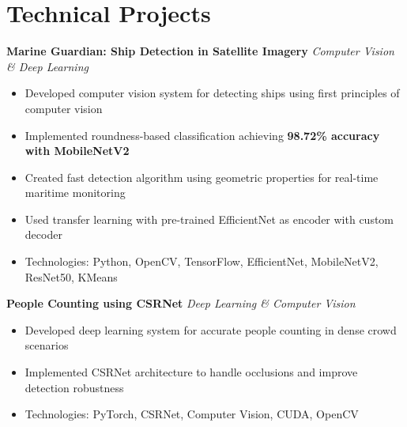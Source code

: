 \documentclass[11pt,a4paper]{article}
\begin{document}
\section*{Technical Projects}
\noindent
\textbf{Marine Guardian: Ship Detection in Satellite Imagery} \hfill \textit{Computer Vision \& Deep Learning}
\noindent
\begin{itemize}[nosep]
    \item Developed computer vision system for detecting ships using first principles of computer vision
    \item Implemented roundness-based classification achieving \textbf{98.72\% accuracy with MobileNetV2}
    \item Created fast detection algorithm using geometric properties for real-time maritime monitoring
    \item Used transfer learning with pre-trained EfficientNet as encoder with custom decoder
    \item Technologies: Python, OpenCV, TensorFlow, EfficientNet, MobileNetV2, ResNet50, KMeans
\end{itemize}


\noindent
\textbf{People Counting using CSRNet} \hfill \textit{Deep Learning \& Computer Vision}
\noindent
\begin{itemize}[nosep]
    \item Developed deep learning system for accurate people counting in dense crowd scenarios
    \item Implemented CSRNet architecture to handle occlusions and improve detection robustness
    \item Technologies: PyTorch, CSRNet, Computer Vision, CUDA, OpenCV
\end{itemize}
\end{document}
